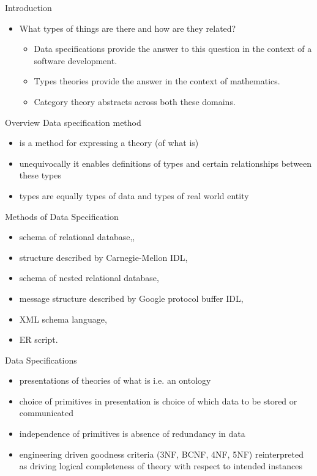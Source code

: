 
\begin{frame}{Introduction}
\begin{itemize}
\item
What types of things are there and how are they related? 
\begin{itemize}
\pause \item Data specifications provide the answer to this question in the context of a software development. 
\pause \item Types theories provide the answer in the context of mathematics. 
\pause \item Category theory abstracts across both these domains.
\end{itemize}
\end{itemize}
\end{frame}

\begin{frame}{Overview}
Data specification method 
\begin{itemize}
\item is a method for expressing a  theory (of what is)
\item unequivocally it enables definitions of types and certain relationships between these types
\item types are equally types of data and types of real world entity
\end{itemize}
\end{frame}

\begin{frame}{Methods of Data Specification}
\begin{itemize}
	\item schema of relational database,,
	\item structure described by Carnegie-Mellon IDL,
	\item schema of nested relational database,
	\item message structure described by Google protocol buffer IDL,
	\item XML schema language,
	\item ER script.
\end{itemize}
\begin{arrows}
\end{arrows}
\end{frame}

\begin{frame}{Data Specifications}
\begin{itemize}
\item presentations of theories of what is i.e. an ontology
\item choice of primitives in presentation is choice of which data to be stored or communicated
\item independence of primitives is absence of redundancy in data 
\item engineering driven goodness criteria (3NF, BCNF, 4NF, 5NF) reinterpreted as driving logical completeness of theory with respect to intended instances
\end{itemize}
\end{frame}


